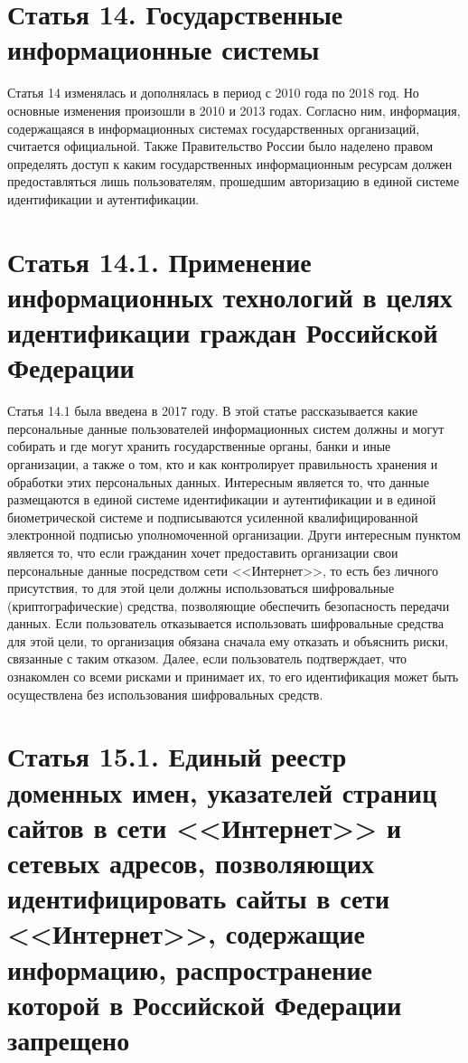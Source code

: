 \section{Статья 14. Государственные информационные системы}

Статья 14 изменялась и дополнялась в период с 2010 года по 2018 год. Но основные изменения произошли в 2010 и 2013 годах. Согласно ним, информация, содержащаяся в информационных системах государственных организаций, считается официальной. Также Правительство России было наделено правом определять доступ к каким государственных информационным ресурсам должен предоставляться лишь пользователям, прошедшим авторизацию в единой системе идентификации и аутентификации.

\section{Статья 14.1. Применение информационных технологий в целях идентификации граждан Российской Федерации}

Статья 14.1 была введена в 2017 году. В этой статье рассказывается какие персональные данные пользователей информационных систем должны и могут собирать и где могут хранить государственные органы, банки и иные организации, а также о том, кто и как контролирует правильность хранения и обработки этих персональных данных. Интересным является то, что данные размещаются в единой системе идентификации и аутентификации и в единой биометрической системе  и подписываются усиленной квалифицированной электронной подписью уполномоченной организации. Други интересным пунктом является то, что если гражданин хочет предоставить организации свои персональные данные посредством сети <<Интернет>>, то есть без личного присутствия, то для этой цели должны использоваться шифровальные (криптографические) средства, позволяющие обеспечить безопасность передачи данных. Если пользователь отказывается использовать шифровальные средства для этой цели, то организация обязана сначала ему отказать и объяснить риски, связанные с таким отказом. Далее, если пользователь подтверждает, что ознакомлен со всеми рисками и принимает их, то его идентификация может быть осуществлена без использования шифровальных средств.

\section{Статья 15.1. Единый реестр доменных имен, указателей страниц сайтов в сети <<Интернет>> и сетевых адресов, позволяющих идентифицировать сайты в сети <<Интернет>>, содержащие информацию, распространение которой в Российской Федерации запрещено}

